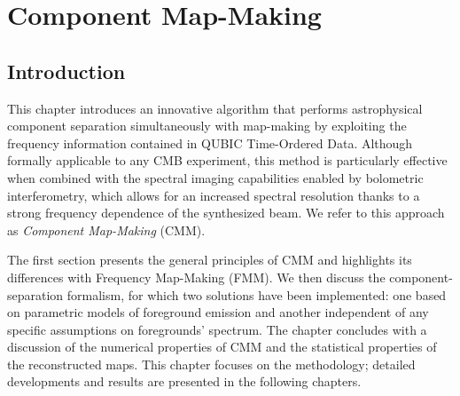 \documentclass[../../thesis.tex]{subfiles}
\begin{document}
\chapter{Component Map-Making} \label{chap:CMM}

\ifSubfilesClassLoaded{
    \tableofcontents
}{
    \minitoc
}

\section*{Introduction}

This chapter introduces an innovative algorithm that performs astrophysical component separation simultaneously with map-making by exploiting the frequency information contained in QUBIC Time-Ordered Data. Although formally applicable to any CMB experiment, this method is particularly effective when combined with the spectral imaging capabilities enabled by bolometric interferometry, which allows for an increased spectral resolution thanks to a strong frequency dependence of the synthesized beam. We refer to this approach as \emph{Component Map-Making} (CMM).

The first section presents the general principles of CMM and highlights its differences with Frequency Map-Making (FMM). We then discuss the component-separation formalism, for which two solutions have been implemented: one based on parametric models of foreground emission and another independent of any specific assumptions on foregrounds' spectrum. The chapter concludes with a discussion of the numerical properties of CMM and the statistical properties of the reconstructed maps. This chapter focuses on the methodology; detailed developments and results are presented in the following chapters. \\

\end{document}

